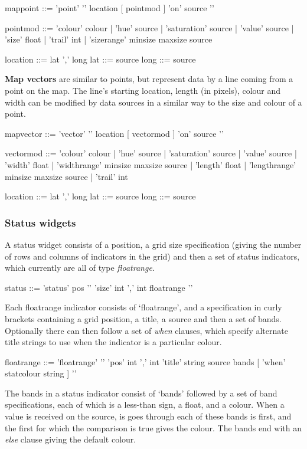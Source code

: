 \begin{v}
mappoint    ::= 'point' '{' location [{ pointmod }] 'on' source '}'

pointmod    ::= 'colour' colour
            |   'hue' source
            |   'saturation' source
            |   'value' source
            |   'size' float
            |   'trail' int
            |   'sizerange' minsize maxsize source

location    ::= lat ',' long
lat         ::= source
long        ::= source
\end{v}

\textbf{Map vectors} are similar to points, but represent data
by a line coming from a point on the map. The line's starting location,
length (in pixels), colour and width can be modified by data sources
in a similar way to the size and colour of a point.

\begin{v}
mapvector    ::= 'vector' '{' location [{ vectormod }] 'on' source '}'

vectormod    ::= 'colour' colour
            |   'hue' source
            |   'saturation' source
            |   'value' source
            |   'width' float
            |   'widthrange' minsize maxsize source
            |   'length' float
            |   'lengthrange' minsize maxsize source
            |   'trail' int

location    ::= lat ',' long
lat         ::= source
long        ::= source
\end{v}

\subsubsection{Status widgets}
A status widget consists of a position, a grid size specification
(giving the number of rows and columns of indicators in the grid)
and then a set of status indicators, which currently are all
of type \emph{floatrange.} 

\begin{v}
status      ::= 'status' pos '{' 
                'size' int ',' int
                { floatrange }
               '}'
\end{v}

Each floatrange indicator consists of `floatrange', and a specification
in curly brackets containing a grid position, a title, a source
and then a set of bands. Optionally there can then follow a set
of \emph{when} clauses, which specify alternate title strings
to use when the indicator is a particular colour.
\begin{v}
floatrange  ::= 'floatrange' '{' 
                    'pos' int ',' int
                    'title' string
                    source
                    bands
                    [{ 'when' statcolour string }]
                '}'
\end{v}
The bands in a status indicator consist of `bands' followed by
a set of band specifications, each of which is a less-than sign,
a float, and a colour. When a value is received on the source,
is goes through each of these bands is first, and the first for
which the comparison is true gives the colour. The bands end
with an \emph{else} clause giving the default colour.

